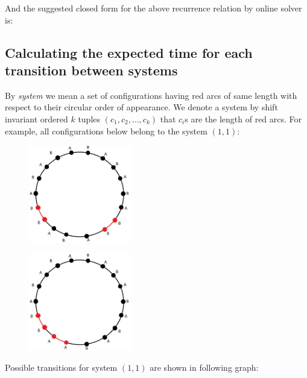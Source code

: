 \documentclass[]{book}
\theoremstyle{definition}
\begin{document}
And the suggested closed form for the above recurrence relation by online solver is:
\newpage


\subsection{Calculating the expected time for each transition between systems}
By \emph{system} we mean a set of configurations having red arcs of same length with respect to their circular order of appearance. We denote a system by shift invariant ordered $k$ tuples $\left( c_1, c_2, \hdots, c_k\right)$ that $c_i$s are the length of red arcs. For example, all configurations below belong to the system $\left( 1, 1 \right)$:
\begin{figure}[H]
    \centering
    \includegraphics[width=0.4\textwidth]{figures/s1.jpg}
    \caption{}
\end{figure}
\begin{figure}[H]
    \centering
    \includegraphics[width=0.4\textwidth]{figures/s2.jpg}
    \caption{}
\end{figure}
Possible transitions for system $\left( 1, 1 \right)$ are shown in following graph:
\end{document}
